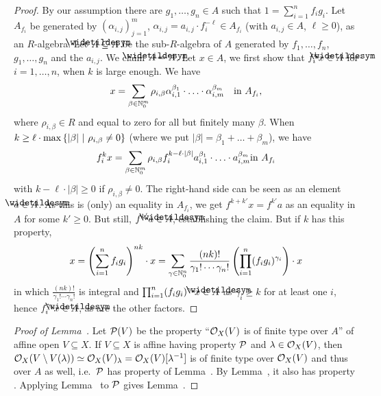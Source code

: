 \documentclass[a4paper,parskip=half,numbers=enddot, DIV=12]{scrreprt}
\begin{document}
\begin{proof}
    By our assumption there are $g_1,\ldots,g_n\in A$ such that $1=\sum_{i=1}^n f_ig_i$. Let $A_{f_i}$ be generated by $(\alpha_{i,j})_{j=1}^m$, $\alpha_{i,j} = a_{i,j}\cdot f_i^{-\ell}\in A_{f_i}$ (with $a_{i,j}\in A$, $\ell\geq0$), as an $R$-algebra. Let $\snake A\subseteq A$ be the sub-$R$-algebra of $A$ generated by $f_1,\ldots,f_n$, $g_1,\ldots,g_n$ and the  $a_{i,j}$. We claim $\snake A = A$. Let $x\in A$, we first show that $f_i^kx \in \snake A$ for $i=1,\ldots, n$, when $k$ is large enough. We have 
    \begin{align*}
        x = \sum_{\beta \in \mathbb{N}_0^m} \rho_{i,\beta} \alpha_{i,1}^{\beta_1}\cdot\ldots\cdot \alpha_{i,m}^{\beta_m}\quad\text{in }A_{f_i}\text{,}
    \end{align*}
    where $\rho_{i,\beta}\in R$ and equal to zero for all but finitely many $\beta$. When $k\geq \ell\cdot \max\left\{|\beta|\ \middle|\  \rho_{i,\beta}\neq 0\right\}$ (where we put $|\beta|=\beta_1+\ldots+\beta_m$), we have
    \begin{align*}
        f_i^kx = \sum_{\beta \in \mathbb{N}_0^m} \rho_{i,\beta}f_i^{k-\ell\cdot|\beta|} a_{i,1}^{\beta_1}\cdot\ldots\cdot a_{i,m}^{\beta_m}\text{in }A_{f_i}
    \end{align*}
    with $k-\ell\cdot|\beta|\geq 0$ if $\rho_{i,\beta}\neq 0$. The right-hand side can be seen as an element $a\in\snake{A}$. As this is (only) an equality in $A_{f_i}$, we get $f^{k+k'}x=f^{k'}a$ as an equality in $A$ for some $k'\geq0$. But still, $f^{k'}a\in\snake{A}$, establishing the claim. But if $k$ has this property,
    \begin{align*}
        x = \left(\sum_{i=1}^n f_ig_i\right)^{nk}\cdot x= \sum_{\gamma\in\mathbb{N}_0^n} \frac{(nk)!}{\gamma_1!\cdots\gamma_n!} \left(\prod_{i=1}^n (f_ig_i)^{\gamma_i}\right)\cdot x
    \end{align*}
    in which $\frac{(nk)!}{\gamma_1!\cdots\gamma_n!}$ is integral and $\prod_{i=1}^n (f_ig_i)^{\gamma_i}x\in \snake A$ as $\gamma_i\geq k$ for at least one $i$, hence $f_i^{\gamma_i}x\in\snake A$, as are the other factors.
\end{proof}

\begin{proof}[Proof of Lemma~]
    Let $\mathcal{P}(V)$ be the property ``$\mathcal{O}_X(V)$ is of finite type over $A$'' of affine open $V\subseteq X$. If $V\subseteq X$ is affine having property $\mathcal{P}$ and $\lambda\in\mathcal{O}_X(V)$, then $\mathcal{O}_X(V\setminus V(\lambda))\simeq\mathcal{O}_X(V)_\lambda=\mathcal{O}_X(V)[\lambda^{-1}]$ is of finite type over $\mathcal{O}_X(V)$ and thus over $A$ as well, i.e.\ $\mathcal{P}$ has property \itememph{\alpha} of Lemma~. By Lemma~, it also has property \itememph{\beta}. Applying Lemma~ to $\mathcal{P}$ gives Lemma~.
\end{proof}
\end{document}
